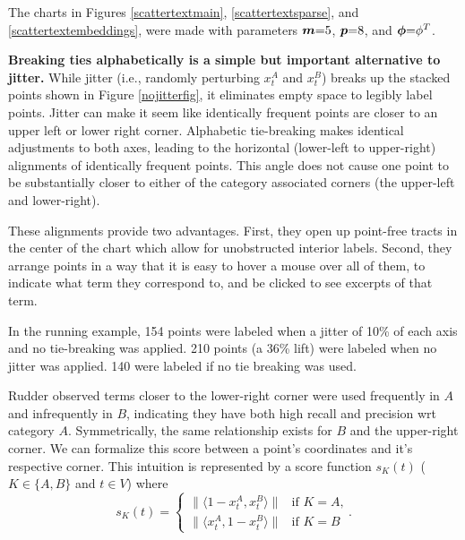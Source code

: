 \documentclass[11pt,a4paper]{article}
\begin{document}
The charts in Figures \ref{scattertextmain}, \ref{scattertextsparse}, and \ref{scattertextembeddings}, were made with parameters $\mbox{\boldmath$m$}{=}5$, $\mbox{\boldmath$p$}{=}8$, and $\mbox{\boldmath$\phi$}{=}\phi^{T}$. 

\textbf{Breaking ties alphabetically is a simple but important alternative to jitter.} While jitter (i.e., randomly perturbing $x_{t}^{A}$ and $x_{t}^{B}$) breaks up the stacked points shown in Figure \ref{nojitterfig}, it eliminates empty space to legibly label points.  Jitter can make it seem like identically frequent points are closer to an upper left or lower right corner.  Alphabetic tie-breaking makes identical adjustments to both axes, leading to the horizontal (lower-left to upper-right) alignments of identically frequent points.  This angle does not cause one point to be substantially closer to either of the category associated corners (the upper-left and lower-right). 

These alignments provide two advantages. First, they open up point-free tracts in the center of the chart which allow for unobstructed interior labels. Second, they arrange points in a way that it is easy to hover a mouse over all of them, to indicate what term they correspond to, and be clicked to see excerpts of that term.

In the running example, 154 points were labeled when a jitter of 10\% of each axis and no tie-breaking was applied. 210 points (a 36\% lift) were labeled when no jitter was applied. 140 were labeled if no tie breaking was used.

Rudder  observed terms closer to the lower-right corner were used frequently in $A$ and infrequently in $B$, indicating they have both high recall and precision wrt category $A$.  Symmetrically, the same relationship exists for $B$ and the upper-right corner.  We can formalize this score between a point's coordinates and it's respective corner.  This intuition is represented by a score function $s_K(t)$ ($K\in\{A,B\}$ and $t\in V$) where
\vspace{-.3cm}
\begin{equation}
s_K(t)= 
\begin{cases} \|\langle 1-x_{t}^{A}, x_{t}^{B}\rangle\| & \text{if $K=A$,}
\\
\|\langle x_{t}^{A}, 1-x_{t}^{B}\rangle\| &\text{if $K=B$}
\end{cases}.
  \label{eqn:cornerscore}
\end{equation}
\end{document}
